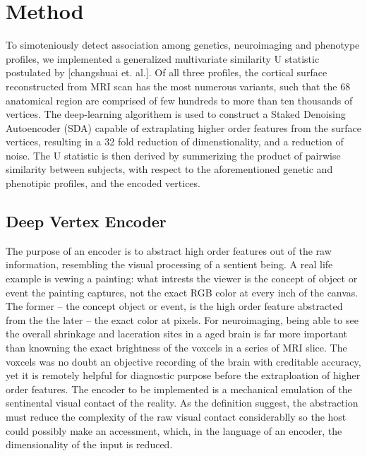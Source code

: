 \documentclass[twocolumn]{article}
\begin{document}
\section{Method}

To simoteniously detect association among genetics, neuroimaging and phenotype profiles, we implemented a generalized multivariate similarity U statistic postulated by [changshuai et. al.]. Of all three profiles, the cortical surface reconstructed from MRI scan has the most numerous variants, such that the 68 anatomical region are comprised of few hundreds to more than ten thousands of vertices. The deep-learning algorithem is used to construct a Staked Denoising Autoencoder (SDA) capable of extraplating higher order features from the surface vertices, resulting in a 32 fold reduction of dimenstionality, and a reduction of noise. The U statistic is then derived by summerizing the product of pairwise similarity between subjects, with respect to the aforementioned genetic and phenotipic profiles, and the encoded vertices. 

\subsection{Deep Vertex Encoder}
The purpose of an encoder is to abstract high order features out of the raw information, resembling the visual processing of a sentient being. A real life example is vewing a painting: what intrests the viewer is the concept of object or event the painting captures, not the exact RGB color at every inch of the canvas. The former -- the concept object or event, is the high order feature abstracted from the the later -- the exact color at pixels. For neuroimaging, being able to see the overall shrinkage and laceration sites in a aged brain is far more important than knowning the exact brightness of the voxcels in a series of MRI slice. The voxcels was no doubt an objective recording of the brain with creditable accuracy, yet it is remotely helpful for diagnostic purpose before the extraploation of higher order features. The encoder to be implemented is a mechanical emulation of the sentinental visual contact of the reality. As the definition suggest, the abstraction must reduce the complexity of the raw visual contact considerablly so the host could possibly make an accessment, which, in the language of an encoder, the dimensionality of the input is reduced.  
\end{document}
